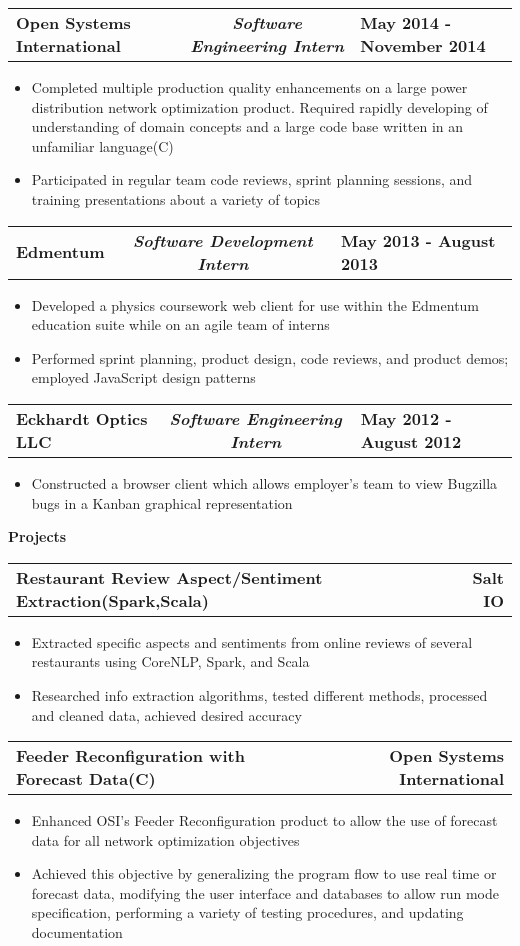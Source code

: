 \documentclass[letterpaper,10pt]{article}
\newcommand{\resitem}[1]{\item[$\triangleright$] #1 

}
\newcommand{\resHeading}[1]{
	{
		\large\colorbox{mygrey}
		{
			\begin{minipage}{\textwidth}

			\centerline{\textbf{#1 \vphantom{p\^{E}}}}
			\end{minipage}
		}
	}
}
\newcommand{\twoColResSubHeading}[2]{
	\begin{tabularx}{\textwidth}{Xr}
			\textbf{#1} & \textbf{#2}
	\end{tabularx}
}
\newcommand{\threeColResSubHeading}[3]{
	\begin{tabularx}{\textwidth}{XcX}
			\textbf{#1} & \centering \textit{\textbf{#2}}  & \hfill\textbf{#3}
	\end{tabularx}
}
\begin{document}
		\threeColResSubHeading{Open Systems International}{Software Engineering Intern}{May 2014 - November 2014}
			\begin{itemize}
				\resitem{Completed multiple production quality enhancements on a large power distribution network optimization product. Required rapidly developing of understanding of domain concepts and a large code base written in an unfamiliar language(C)}
				\resitem{Participated in regular team code reviews, sprint planning sessions, and training presentations about a variety of topics}
			\end{itemize}
		\threeColResSubHeading{Edmentum}{Software Development Intern}{May 2013 - August 2013}
			\begin{itemize}
				\resitem{Developed a physics coursework web client for use within the Edmentum education suite while on an agile team of interns}
				\resitem{Performed sprint planning, product design, code reviews, and product demos; employed JavaScript design patterns}
			\end{itemize}
		\threeColResSubHeading{Eckhardt Optics LLC}{Software Engineering Intern}{May 2012 - August 2012}
			\begin{itemize}
				\resitem{Constructed a browser client which allows employer's team to view Bugzilla bugs in a Kanban graphical representation}
			\end{itemize}
	\resHeading{Projects}
		\twoColResSubHeading{Restaurant Review Aspect/Sentiment Extraction(Spark,Scala)}{Salt IO}
			\begin{itemize}
				\resitem{Extracted specific aspects and sentiments from online reviews of several restaurants using CoreNLP, Spark, and Scala}
				\resitem{Researched info extraction algorithms, tested different methods, processed and cleaned data, achieved desired accuracy}
			\end{itemize}
		\twoColResSubHeading{Feeder Reconfiguration with Forecast Data(C)}{Open Systems International}
			\begin{itemize}
				\resitem{Enhanced OSI's Feeder Reconfiguration product to allow the use of forecast data for all network optimization objectives}
				\resitem{Achieved this objective by generalizing the program flow to use real time or forecast data, modifying the user interface and databases to allow run mode specification, performing a variety of testing procedures, and updating documentation}
			\end{itemize}
\end{document}

